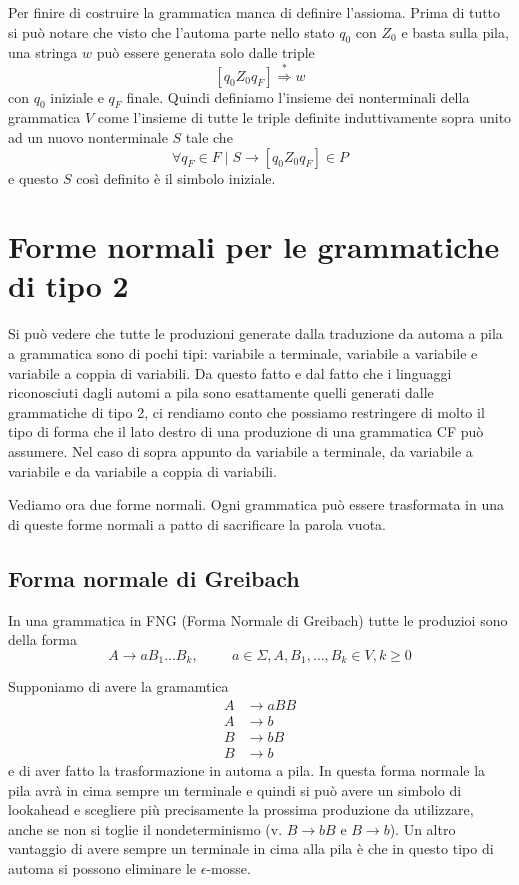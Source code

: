 \documentclass[12pt]{report}
\begin{document}
Per finire di costruire la grammatica manca di definire l'assioma.
Prima di tutto si può notare che visto che l'automa parte nello stato $q_0$ con $Z_0$ e basta sulla pila, una stringa $w$ può essere generata solo dalle triple 
$$[q_0Z_0q_F] \overset{*}{\Rightarrow} w$$
con $q_0$ iniziale e $q_F$ finale.
Quindi definiamo l'insieme dei nonterminali della grammatica $V$ come l'insieme di tutte le triple definite induttivamente sopra unito ad un nuovo nonterminale $S$ tale che
$$ \forall q_F \in F \mid S \rightarrow [q_0 Z_0 q_F] \in P $$
e questo $S$ così definito è il simbolo iniziale.

\section{Forme normali per le grammatiche di tipo 2}
Si può vedere che tutte le produzioni generate dalla traduzione da automa a pila a grammatica sono di pochi tipi: variabile a terminale, variabile a variabile e variabile a coppia di variabili.
Da questo fatto e dal fatto che i linguaggi riconosciuti dagli automi a pila sono esattamente quelli generati dalle grammatiche di tipo 2, ci rendiamo conto che possiamo restringere di molto il tipo di forma che il lato destro di una produzione di una grammatica CF può assumere.
Nel caso di sopra appunto da variabile a terminale, da variabile a variabile e da variabile a coppia di variabili.

Vediamo ora due forme normali.
Ogni grammatica può essere trasformata in una di queste forme normali a patto di sacrificare la parola vuota.

\subsection{Forma normale di Greibach}
In una grammatica in FNG (Forma Normale di Greibach) tutte le produzioi sono della forma
$$ A \rightarrow a B_1 \dots B_k, \hspace{1cm} a \in \Sigma, A, B_1, \dots, B_k \in V, k \geq 0 $$

Supponiamo di avere la gramamtica
\begin{align*}
	A &\rightarrow a B B \\
	A &\rightarrow b \\
	B &\rightarrow b B \\
	B &\rightarrow b
\end{align*}
e di aver fatto la trasformazione in automa a pila.
In questa forma normale la pila avrà in cima sempre un terminale e quindi si può avere un simbolo di lookahead e scegliere più precisamente la prossima produzione da utilizzare, anche se non si toglie il nondeterminismo (v. $B \rightarrow b B$ e $B \rightarrow b$).
Un altro vantaggio di avere sempre un terminale in cima alla pila è che in questo tipo di automa si possono eliminare le $\epsilon$-mosse.
\end{document}
